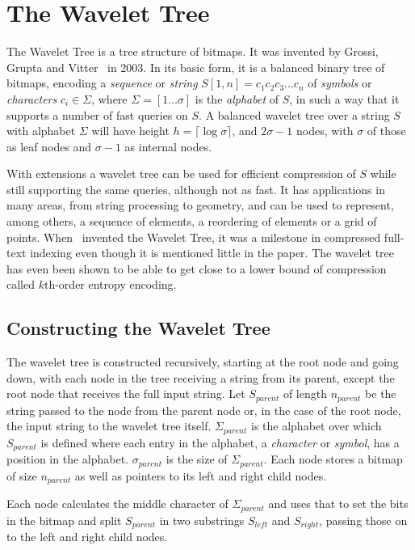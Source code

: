 \section{The Wavelet Tree}
The Wavelet Tree is a tree structure of bitmaps.
It was invented by Grossi, Grupta and Vitter~ in 2003.
In its basic form, it is a balanced binary tree of bitmaps, encoding a \textit{sequence} or \textit{string} $S[1,n] = c_1c_2c_3 \ldots c_n$ of \textit{symbols} or \textit{characters} $c_i \in \Sigma$, where $\Sigma = [1 \ldots \sigma]$ is the \textit{alphabet} of $S$, in such a way that it supports a number of fast queries on $S$.
A balanced wavelet tree over a string $S$ with alphabet $\Sigma$ will have height $h = \lceil \log \sigma \rceil$, and $2 \sigma - 1$ nodes, with $\sigma$ of those as leaf nodes and $\sigma - 1$ as internal nodes.

With extensions a wavelet tree can be used for efficient compression of $S$ while still supporting the same queries, although not as fast.
It has applications in many areas, from string processing to geometry, and can be used to represent, among others, a sequence of elements, a reordering of elements or a grid of points. 
When~ invented the Wavelet Tree, it was a milestone in compressed full-text indexing even though it is mentioned little in the paper.
The wavelet tree has even been shown to be able to get close to a lower bound of compression called $k$th-order entropy encoding.

\subsection{Constructing the Wavelet Tree}
\label{sec:nodeconstruction}
The wavelet tree is constructed recursively, starting at the root node and going down, with each node in the tree receiving a string from its parent, except the root node that receives the full input string.
Let $S_{parent}$ of length $n_{parent}$ be the string passed to the node from the parent node or, in the case of the root node, the input string to the wavelet tree itself.
$\Sigma_{parent}$ is the alphabet over which $S_{parent}$ is defined where each entry in the alphabet, a \textit{character} or \textit{symbol}, has a position in the alphabet.
$\sigma_{parent}$ is the size of $\Sigma_{parent}$.
Each node stores a bitmap of size $n_{parent}$ as well as pointers to its left and right child nodes.

Each node calculates the middle character of $\Sigma_{parent}$ and uses that to set the bits in the bitmap and split $S_{parent}$ in two substrings $S_{left}$ and $S_{right}$, passing those on to the left and right child nodes.

